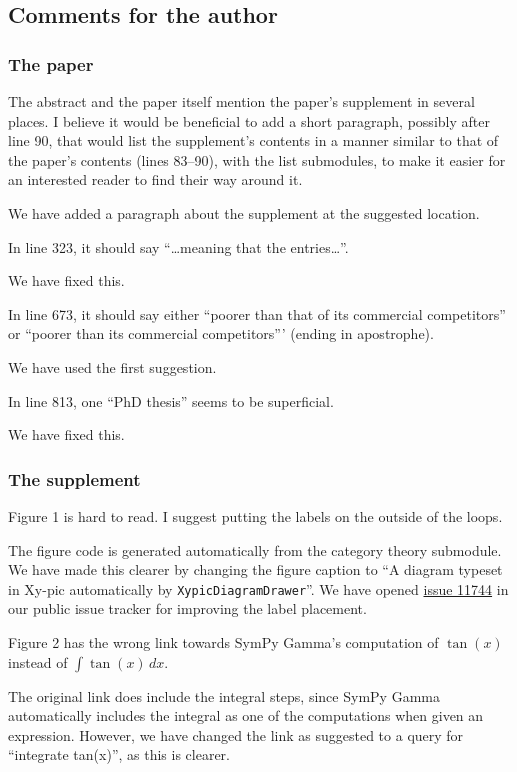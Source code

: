 \documentclass[answers,12pt]{exam}
\begin{document}
\subsection{Comments for the author}
\subsubsection{The paper}

\begin{questions}
\question The abstract and the paper itself mention the paper's supplement in several places. I believe it would be beneficial to add a short paragraph, possibly after line 90, that would list the supplement's contents in a manner similar to that of the paper's contents (lines 83--90), with the list submodules, to make it easier for an interested reader to find their way around it.
\begin{solution}
We have added a paragraph about the supplement at the suggested location.
\end{solution}

\question In line 323, it should say ``\ldots meaning that the entries\ldots''.
\begin{solution}
We have fixed this.
\end{solution}

\question In line 673, it should say either ``poorer than that of its commercial competitors'' or ``poorer than its commercial competitors''' (ending in apostrophe).
\begin{solution}
We have used the first suggestion.
\end{solution}

\question In line 813, one ``PhD thesis'' seems to be superficial.
\begin{solution}
We have fixed this.
\end{solution}

\subsubsection{The supplement}

\question Figure 1 is hard to read. I suggest putting the labels on the outside of the loops.
\begin{solution}
The figure code is generated automatically from the category theory submodule. We
have made this clearer by changing the figure caption to ``A diagram typeset
in Xy-pic automatically by \texttt{XypicDiagramDrawer}''. We have opened
\href{https://github.com/sympy/sympy/issues/11744}{issue 11744} in our public
issue tracker for improving the label placement.
\end{solution}

\question Figure 2 has the wrong link towards SymPy Gamma's computation of $\tan(x)$
 instead of $\int \tan(x)\,dx$.
\begin{solution}
The original link does include the integral steps, since SymPy Gamma
automatically includes the integral as one of the computations when given an
expression. However, we have changed the link as suggested to a query for
``integrate tan(x)'', as this is clearer.
\end{solution}

\end{questions}
\end{document}
